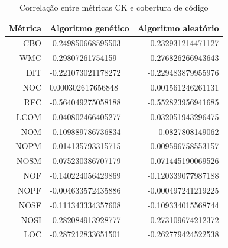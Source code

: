 \documentclass[
	12pt,				%
	oneside,			%
	a4paper,			%
	english,			%
	brazil				%
	]{abntex2ppgsi}
\begin{document}
\begin{table}[h]
\centering
\caption{Correlação entre métricas CK e cobertura de código}
\vspace{0.5cm}
\begin{tabular}{r|lr}

										
Métrica & Algoritmo genético & Algoritmo aleatório \\ %
\hline                               %
CBO	& -0.249850668595503	& 	-0.232931214471127 \\
WMC	& -0.29807261754159	& 	-0.276826266943643 \\
DIT	& -0.221073021178272		& -0.229483879955976 \\
NOC& 	0.000302617656848	& 	0.001561246261131 \\
RFC	& -0.564049275058188		& -0.552823956941685 \\
LCOM	 & -0.040802466405277	& 	-0.032051943296475 \\
NOM	& -0.109889786736834		& -0.0827808149062 \\
NOPM	 & -0.014135793315715		& 0.009596758553157 \\
NOSM	 & -0.075230386707179	& 	-0.071445190069526 \\
NOF	& -0.140224056429869	& 	-0.120339077987188 \\
NOPF	& -0.004633572435886		& -0.000497241219225 \\
NOSF	& -0.111343334357608		& -0.109334015568744 \\
NOSI	& -0.282084913928777	& 	-0.273109674212372 \\
LOC	& -0.287212833651501	& 	-0.262779424522538

\end{tabular}
\label{table:correlacao-cobertura}
\end{table}
\end{document}
